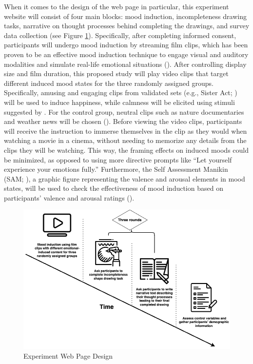 \documentclass[../Proposal.tex]{subfiles}
\begin{document}
When it comes to the design of the web page in particular, this experiment website will consist of four main blocks: mood induction, incompleteness drawing tasks, narrative on thought processes behind completing the drawings, and survey data collection (see Figure \ref{fig: Experiment Web Page Design}). Specifically, after completing informed consent, participants will undergo mood induction by streaming film clips, which has been proven to be an effective mood induction technique to engage visual and auditory modalities and simulate real-life emotional situations (\cite{siedlecka_experimental_2019}). After controlling display size and film duration, this proposed study will play video clips that target different induced mood states for the three randomly assigned groups. Specifically, amusing and engaging clips from validated sets (e.g., Sister Act; \cite{maryam_fakhrhosseini_affectemotion_2017}) will be used to induce happiness, while calmness will be elicited using stimuli suggested by \textcite{kimura_emotional_2019}. For the control group, neutral clips such as nature documentaries and weather news will be chosen (\cite{siedlecka_experimental_2019}). Before viewing the video clips, participants will receive the instruction to immerse themselves in the clip as they would when watching a movie in a cinema, without needing to memorize any details from the clips they will be watching. This way, the framing effects on induced moods could be minimized, as opposed to using more directive prompts like ``Let yourself experience your emotions fully.'' Furthermore, the Self Assessment Manikin (SAM; \cite{bradley_affect_1999}), a graphic figure representing the valence and arousal elements in mood states, will be used to check the effectiveness of mood induction based on participants' valence and arousal ratings (\cite{kucera_using_2012}).

\begin{figure}
    \centering
    \includegraphics[width=0.7\linewidth, keepaspectratio]{drawio/Experiment Timeline.png}
    \caption{Experiment Web Page Design}
    \label{fig: Experiment Web Page Design}
\end{figure}
\end{document}
